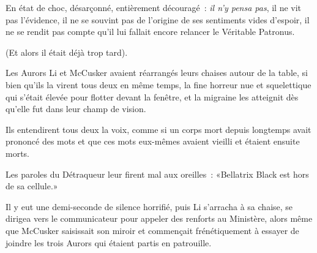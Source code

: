 En état de choc, désarçonné, entièrement découragé~: \emph{il n'y pensa pas}, il ne vit pas l'évidence, il ne se souvint pas de l'origine de ses sentiments vides d'espoir, il ne se rendit pas compte qu'il lui fallait encore relancer le Véritable Patronus.

(Et alors il était déjà trop tard).

\later

Les Aurors Li et McCusker avaient réarrangés leurs chaises autour de la table, si bien qu'ils la virent tous deux en même temps, la fine horreur nue et squelettique qui s'était élevée pour flotter devant la fenêtre, et la migraine les atteignit dès qu'elle fut dans leur champ de vision.

Ils entendirent tous deux la voix, comme si un corps mort depuis longtemps avait prononcé des mots et que ces mots eux-mêmes avaient vieilli et étaient ensuite morts.

Les paroles du Détraqueur leur firent mal aux oreilles~: «Bellatrix Black est hors de sa cellule.»

Il y eut une demi-seconde de silence horrifié, puis Li s'arracha à sa chaise, se dirigea vers le communicateur pour appeler des renforts au Ministère, alors même que McCusker saisissait son miroir et commençait frénétiquement à essayer de joindre les trois Aurors qui étaient partis en patrouille. 

